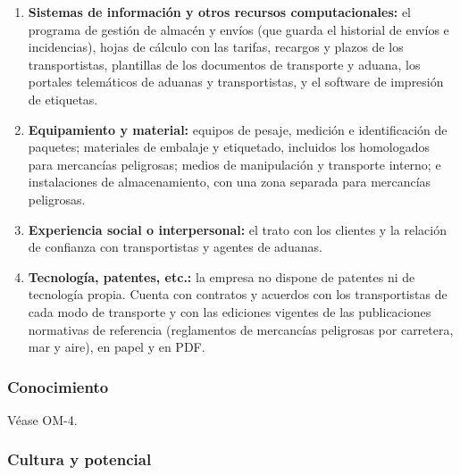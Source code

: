\documentclass[12pt,a4paper,twoside,spanish]{article}      %
\begin{document}
\begin{enumerate}
    \item \textbf{Sistemas de información y otros recursos computacionales:} el programa de gestión de almacén y envíos (que guarda el historial de envíos e incidencias), hojas de cálculo con las tarifas, recargos y plazos de los transportistas, plantillas de los documentos de transporte y aduana, los portales telemáticos de aduanas y transportistas, y el software de impresión de etiquetas.
    \item \textbf{Equipamiento y material:} equipos de pesaje, medición e identificación de paquetes; materiales de embalaje y etiquetado, incluidos los homologados para mercancías peligrosas; medios de manipulación y transporte interno; e instalaciones de almacenamiento, con una zona separada para mercancías peligrosas.
    \item \textbf{Experiencia social o interpersonal:} el trato con los clientes y la relación de confianza con transportistas y agentes de aduanas.
    \item \textbf{Tecnología, patentes, etc.:} la empresa no dispone de patentes ni de tecnología propia. Cuenta con contratos y acuerdos con los transportistas de cada modo de transporte y con las ediciones vigentes de las publicaciones normativas de referencia (reglamentos de mercancías peligrosas por carretera, mar y aire), en papel y en PDF.
\end{enumerate}

\subsubsection{Conocimiento}

Véase OM-4.

\subsubsection{Cultura y potencial}
\end{document}
